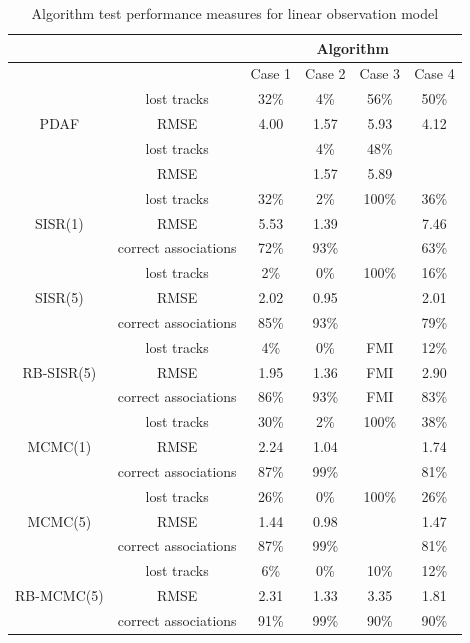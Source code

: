 \begin{table} \centering
\begin{tabular}{|c|c|c|c|c|c|}
\hline
 & & \multicolumn{4}{|c|}{Algorithm} \\
\hline
 & & Case 1 & Case 2 & Case 3 & Case 4 \\
\hline
\multirow{3}{*}{PDAF} & lost tracks             & 32\% & 4\% & 56\% & 50\% \\
                         & RMSE                 & 4.00 & 1.57 & 5.93 & 4.12 \\
\hline
\multirow{3}{*}{JPDAF} & lost tracks            &  & 4\% & 48\% &  \\
                         & RMSE                 &  & 1.57 & 5.89 &  \\
\hline
\multirow{3}{*}{SISR(1)} & lost tracks          & 32\% & 2\% & 100\% & 36\% \\
                         & RMSE                 & 5.53 & 1.39 &  & 7.46 \\
                         & correct associations & 72\% & 93\% &  & 63\% \\
\hline
\multirow{3}{*}{SISR(5)} & lost tracks          & 2\% & 0\% & 100\% & 16\% \\
                         & RMSE                 & 2.02 & 0.95 &  & 2.01 \\
                         & correct associations & 85\% & 93\% &  & 79\% \\
\hline
\multirow{3}{*}{RB-SISR(5)} & lost tracks       & 4\% & 0\% & FMI & 12\% \\
                         & RMSE                 & 1.95 & 1.36 & FMI & 2.90 \\
                         & correct associations & 86\% & 93\% & FMI & 83\% \\
\hline
\multirow{3}{*}{MCMC(1)} & lost tracks          & 30\% & 2\% & 100\% & 38\% \\
                         & RMSE                 & 2.24 & 1.04 &  & 1.74 \\
                         & correct associations & 87\% & 99\% &  & 81\% \\
\hline
\multirow{3}{*}{MCMC(5)} & lost tracks          & 26\% & 0\% & 100\% & 26\% \\
                         & RMSE                 & 1.44 & 0.98 &  & 1.47 \\
                         & correct associations & 87\% & 99\% &  & 81\% \\
\hline
\multirow{3}{*}{RB-MCMC(5)} & lost tracks       & 6\% & 0\% & 10\% & 12\% \\
                         & RMSE                 & 2.31 & 1.33 & 3.35 & 1.81 \\
                         & correct associations & 91\% & 99\% & 90\% & 90\% \\
\hline
\end{tabular}
\caption{Algorithm test performance measures for linear observation model}
\label{tab:ResultsLinear}
\end{table}

